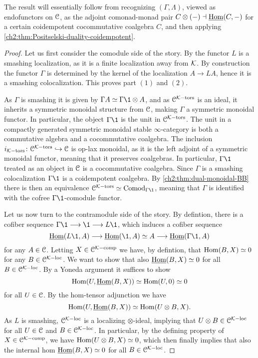 \begin{remark}
    The result will essentially follow from recognizing $(\Gamma, \Lambda)$, viewed as endofunctors on $\EuScript{C}$, as the adjoint comonad-monad pair $C\otimes (-)\dashv \operatorname{\underline{Hom}}(C,-)$ for a certain coidempotent cocommutative coalgebra $C$, and then applying \cref{ch2:thm:Positselski-duality-coidempotent}. 
\end{remark}

\begin{proof}
    Let us first consider the comodule side of the story. By \cite[3.3.3]{hovey-palmiery-strickland_97} the functor $L$ is a smashing localization, as it is a finite localization away from $\mathcal{K}$. By construction the functor $\Gamma$ is determined by the kernel of the localization $A\to LA$, hence it is a smashing colocalization. This proves part $(1)$ and $(2)$. 

    As $\Gamma$ is smashing it is given by $\Gamma A \simeq \Gamma \1 \otimes A$, and as $\EuScript{C}^{\mathcal{K}-\mathrm{tors}}$ is an ideal, it inherits a symmetric monoidal structure from $\EuScript{C}$, making $\Gamma$ a symmetric monoidal functor. In particular, the object $\Gamma \1$ is the unit in $\EuScript{C}^{\mathcal{K}-\mathrm{tors}}$. The unit in a compactly generated symmetric monoidal stable $\infty$-category is both a commutative algebra and a cocommutative coalgebra. The inclusion $i_{\mathcal{K}-\mathrm{tors}}\colon \EuScript{C}^{\mathcal{K}-\mathrm{tors}}\hookrightarrow \EuScript{C}$ is op-lax monoidal, as it is the left adjoint of a symmetric monoidal functor, meaning that it preserves coalgebras. In particular, $\Gamma\1$ treated as an object in $\EuScript{C}$ is a cocommutative coalgebra. Since $\Gamma$ is a smashing colocalization $\Gamma \1$ is a coidempotent coalgebra. By \cref{ch2:thm:dual-monoidal-BB} there is then an equivalence $\C\Ktors\simeq \Comod_{\Gamma\1}$, meaning that $\Gamma$ is identified with the cofree $\Gamma \1$-comodule functor. 

    Let us now turn to the contramodule side of the story. By defintion, there is a cofiber sequence $\Gamma \1 \to \1 \to L\1$, which induces a cofiber sequence 
    \[\iHom(L\1, A) \to \iHom(\1, A)\simeq A \to \iHom(\Gamma \1, A)\]
    for any $A\in \EuScript{C}$. Letting $X \in \EuScript{C}^{\mathcal{K}-\mathrm{comp}}$ we have, by defintion, that $\operatorname{Hom}(B,X) \simeq 0$ for any $B \in \EuScript{C}^{\mathcal{K}-\mathrm{loc}}$. We want to show that also $\operatorname{\underline{Hom}}(B, X) \simeq 0$ for all $B\in \EuScript{C}^{\mathcal{K}-\mathrm{loc}}$. By a Yoneda argument it suffices to show 
    \[\operatorname{Hom}(U, \operatorname{\underline{Hom}}(B, X))\simeq \operatorname{Hom}(U, 0) \simeq 0\]
    for all $U \in \EuScript{C}$. By the hom-tensor adjunction we have 
    \[\operatorname{Hom}(U, \operatorname{\underline{Hom}}(B, X)) \simeq \operatorname{Hom}(U\otimes B, X).\]
    As $L$ is smashing, $\EuScript{C}^{\mathcal{K}-\mathrm{loc}}$ is a localizing $\otimes$-ideal, implying that $U\otimes B \in \EuScript{C}^{\mathcal{K}-\mathrm{loc}}$ for all $U\in \EuScript{C}$ and $B \in \EuScript{C}^{\mathcal{K}-\mathrm{loc}}$. In particular, by the defining property of $X\in \EuScript{C}^{\mathcal{K}-\mathrm{comp}}$, we have $\operatorname{Hom}(U\otimes B, X) \simeq 0$, which then finally implies that also the internal hom $\operatorname{\underline{Hom}}(B, X) \simeq 0$ for all $B \in \EuScript{C}^{\mathcal{K}-\mathrm{loc}}$.   
    

\end{proof}

